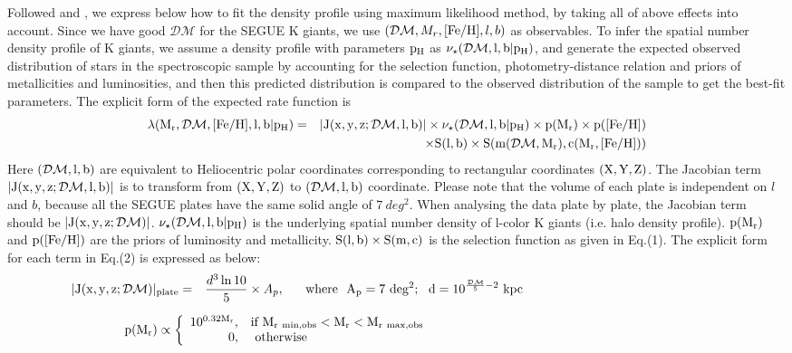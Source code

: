 \documentclass[12pt,preprint]{aastex}
\newcommand{\DM}{\mathcal{DM}}
\newcommand{\feh}{{\rm [Fe/H]}}
\begin{document}
Followed \citet{Bovy2012} and \citet{Rix2013}, we express below how to fit the density profile using maximum likelihood method, by taking all of above effects into account. Since we have good $\DM$ for the SEGUE K giants, we use $(\DM,M_r,\feh,l,b)$ as observables. To infer the spatial number density profile of K giants, we assume a density profile with parameters $\rm p_H$ as $\nu_\star(\rm \DM,l,b|p_H)$, and generate the expected observed distribution of stars in the spectroscopic sample by accounting for the selection function, photometry-distance relation and priors of metallicities and luminosities, and then this predicted distribution is compared to the observed distribution of the sample to get the best-fit parameters. The explicit form of the expected rate function is
\begin{eqnarray}
\rm \lambda(M_r,\DM,\feh,l,b|p_H)&=&\rm |J(x,y,z;\DM,l,b)|\times \nu_\star(\DM,l,b|p_H)\times p(M_r)\times p(\feh)  \nonumber\\
&&\rm \times S(l,b) \times S(m(\DM,M_r),c(M_r,\feh))
 \end{eqnarray}
Here $\rm (\DM,l,b)$ are equivalent to Heliocentric polar coordinates corresponding to rectangular coordinates $\rm (X, Y, Z)$. The Jacobian term $\rm |J(x,y,z;\DM,l,b)|$ is to transform from $\rm (X, Y,Z)$ to $\rm (\DM, l, b)$ coordinate. Please note that the volume of each plate is independent on $l$ and $b$, because all the SEGUE plates have the same solid angle of $7~deg^2$. When analysing the data plate by plate, the Jacobian term should be $\rm |J(x,y,z;\DM)|$. $\nu_\star(\rm \DM,l,b|p_H)$ is the underlying spatial number density of l-color K giants (i.e. halo density profile). $\rm p(M_r)$ and $\rm p(\feh)$ are the priors of luminosity and metallicity. $\rm S(l,b)\times S(m,c)$ is the selection function as given in Eq.(1). The explicit form for each term in Eq.(2) is expressed as below:
\begin{eqnarray}
\rm |J(x,y,z;\DM)|_{plate}&=&\frac{d^3\ln10}{5}\times A_p,~~~~~\rm where~~A_p=7~deg^2;~~d=10^{\frac{\DM}{5}-2}~kpc~~~~~~~~~~~~~~~~~~~~~~~~~~~~~~~~~~~~~~~~~~~~~~~\nonumber
 \end{eqnarray}

$$
\rm p(M_r) \propto \left\{ \begin{array}{rl}
 \rm 10^{0.32M_r}, &\mbox{\rm if $\rm M_{r~min,obs}<M_r<M_{r~max,obs}$} ~~~~~~~~~~~~~~~~~~~~~~~~~~~~~~~~~~~~~~~~~~~~~~~~~~~~~~~\\
  0, &\mbox{ \rm otherwise}~~~~~~~~~~~~~~~~~~~~~~~~~~~~~~~~~~~~~~~~~~~~~~~~~~~~~~~~~~~~~~~~~~~~~~~~~~~~~~~~~~~~
       \end{array} \right.
$$
\end{document}
